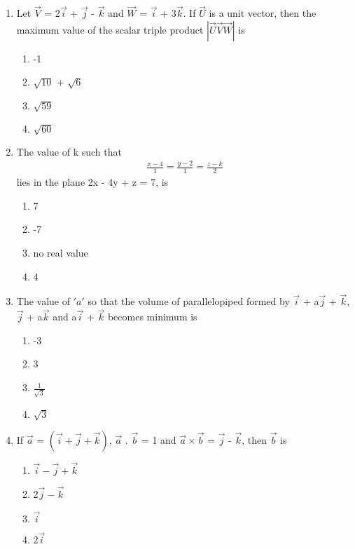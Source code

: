 \begin{enumerate}[label=\arabic*.,ref=\thesubsection.\theenumi]
\item Let $\overrightarrow{V}$ = 2$\overrightarrow{i}$ + $\overrightarrow{j}$ - $\overrightarrow{k}$ and $\overrightarrow{W}$ = $\overrightarrow{i}$ + 3$\overrightarrow{k}$. If $\overrightarrow{U}$ is a unit vector, then the maximum value of the scalar triple product $|\overrightarrow{U}\overrightarrow{V}\overrightarrow{W}|$
is
\begin{enumerate}
\item -1
\item $\sqrt{10}$ + $\sqrt{6}$
\item $\sqrt{59}$
\item $\sqrt{60}$ 
\end{enumerate}

\item The value of k such that 
\begin{align*}
\frac{x - 4}{1} = \frac{y - 2}{1} = \frac{z - k}{2}
\end{align*}
lies in the plane 2x - 4y + z = 7, is
\begin{enumerate}
\item 7
\item -7
\item no real value
\item 4
\end{enumerate}

\item The value of $'a'$ so that the volume of parallelopiped formed by $\overrightarrow{i}$ + a$\overrightarrow{j}$ + $\overrightarrow{k}$, $\overrightarrow{j}$ + a$\overrightarrow{k}$ and a$\overrightarrow{i}$ + $\overrightarrow{k}$ becomes minimum is
\begin{enumerate}
\item -3
\item 3
\item $\frac{1}{\sqrt{3}}$
\item $\sqrt{3}$
\end{enumerate}

\item If $\overrightarrow{a}$ = $(\overrightarrow{i} + \overrightarrow{j} + \overrightarrow{k})$, $\overrightarrow{a}$ . $\overrightarrow{b}$ = 1 and $\overrightarrow{a} \times \overrightarrow{b}$ = 
$\overrightarrow{j}$ - $\overrightarrow{k}$, then $\overrightarrow{b}$ is
\begin{enumerate}
\item $\overrightarrow{i} - \overrightarrow{j} + \overrightarrow{k}$
\item 2$\overrightarrow{j} - \overrightarrow{k}$
\item $\overrightarrow{i}$
\item 2$\overrightarrow{i}$
\end{enumerate}


\end{enumerate}
